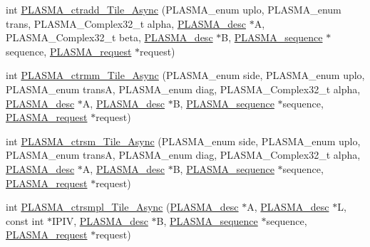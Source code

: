 \begin{DoxyCompactItemize}
\item 
int \hyperlink{group__PLASMA__Complex32__t__Tile__Async_ga7ddee064af68b915fe013fd11c9aa803_ga7ddee064af68b915fe013fd11c9aa803}{P\+L\+A\+S\+M\+A\+\_\+ctradd\+\_\+\+Tile\+\_\+\+Async} (P\+L\+A\+S\+M\+A\+\_\+enum uplo, P\+L\+A\+S\+M\+A\+\_\+enum trans, P\+L\+A\+S\+M\+A\+\_\+\+Complex32\+\_\+t alpha, \hyperlink{structplasma__desc__t}{P\+L\+A\+S\+M\+A\+\_\+desc} $\ast$A, P\+L\+A\+S\+M\+A\+\_\+\+Complex32\+\_\+t beta, \hyperlink{structplasma__desc__t}{P\+L\+A\+S\+M\+A\+\_\+desc} $\ast$B, \hyperlink{structplasma__sequence__t}{P\+L\+A\+S\+M\+A\+\_\+sequence} $\ast$sequence, \hyperlink{structplasma__request__t}{P\+L\+A\+S\+M\+A\+\_\+request} $\ast$request)
\item 
int \hyperlink{group__PLASMA__Complex32__t__Tile__Async_gaeab324c1a4bfd86a85f83f134e8fe1eb_gaeab324c1a4bfd86a85f83f134e8fe1eb}{P\+L\+A\+S\+M\+A\+\_\+ctrmm\+\_\+\+Tile\+\_\+\+Async} (P\+L\+A\+S\+M\+A\+\_\+enum side, P\+L\+A\+S\+M\+A\+\_\+enum uplo, P\+L\+A\+S\+M\+A\+\_\+enum trans\+A, P\+L\+A\+S\+M\+A\+\_\+enum diag, P\+L\+A\+S\+M\+A\+\_\+\+Complex32\+\_\+t alpha, \hyperlink{structplasma__desc__t}{P\+L\+A\+S\+M\+A\+\_\+desc} $\ast$A, \hyperlink{structplasma__desc__t}{P\+L\+A\+S\+M\+A\+\_\+desc} $\ast$B, \hyperlink{structplasma__sequence__t}{P\+L\+A\+S\+M\+A\+\_\+sequence} $\ast$sequence, \hyperlink{structplasma__request__t}{P\+L\+A\+S\+M\+A\+\_\+request} $\ast$request)
\item 
int \hyperlink{group__PLASMA__Complex32__t__Tile__Async_ga99bf0971a147fd78070b0cc2573474af_ga99bf0971a147fd78070b0cc2573474af}{P\+L\+A\+S\+M\+A\+\_\+ctrsm\+\_\+\+Tile\+\_\+\+Async} (P\+L\+A\+S\+M\+A\+\_\+enum side, P\+L\+A\+S\+M\+A\+\_\+enum uplo, P\+L\+A\+S\+M\+A\+\_\+enum trans\+A, P\+L\+A\+S\+M\+A\+\_\+enum diag, P\+L\+A\+S\+M\+A\+\_\+\+Complex32\+\_\+t alpha, \hyperlink{structplasma__desc__t}{P\+L\+A\+S\+M\+A\+\_\+desc} $\ast$A, \hyperlink{structplasma__desc__t}{P\+L\+A\+S\+M\+A\+\_\+desc} $\ast$B, \hyperlink{structplasma__sequence__t}{P\+L\+A\+S\+M\+A\+\_\+sequence} $\ast$sequence, \hyperlink{structplasma__request__t}{P\+L\+A\+S\+M\+A\+\_\+request} $\ast$request)
\item 
int \hyperlink{group__PLASMA__Complex32__t__Tile__Async_ga04fa557b44fcf8941804e07af0776cd6_ga04fa557b44fcf8941804e07af0776cd6}{P\+L\+A\+S\+M\+A\+\_\+ctrsmpl\+\_\+\+Tile\+\_\+\+Async} (\hyperlink{structplasma__desc__t}{P\+L\+A\+S\+M\+A\+\_\+desc} $\ast$A, \hyperlink{structplasma__desc__t}{P\+L\+A\+S\+M\+A\+\_\+desc} $\ast$L, const int $\ast$I\+P\+I\+V, \hyperlink{structplasma__desc__t}{P\+L\+A\+S\+M\+A\+\_\+desc} $\ast$B, \hyperlink{structplasma__sequence__t}{P\+L\+A\+S\+M\+A\+\_\+sequence} $\ast$sequence, \hyperlink{structplasma__request__t}{P\+L\+A\+S\+M\+A\+\_\+request} $\ast$request)

\end{DoxyCompactItemize}
